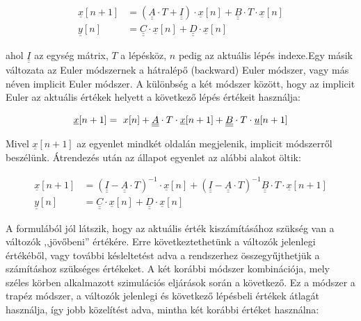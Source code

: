 \begin{equation}
\begin{align*}
\underline{x}[n + 1] &= (\underline{\underline{A}} \cdot T + \underline{\underline{I}}) \cdot \underline{x}[n] + \underline{\underline{B}}\cdot{}T\cdot{}\underline{x}[n] \\[0.3em]
\underline{y}[n] &= \underline{\underline{C}}\cdot \underline{x}[n] + \underline{\underline{D}}\cdot{}\underline{x}[n]
\end{align*} 
\end{equation}

ahol $\underline{\underline{I}}$ az egység mátrix, $T$ a lépésköz, $n$ pedig az aktuális lépés indexe.Egy másik változata az Euler módszernek a hátralépő (backward) Euler módszer, vagy más néven implicit Euler módszer. A különbség a két módszer között, hogy az implicit Euler az aktuális értékek helyett a következő lépés értékeit használja:

\begin{equation}
\underline{x}[n + 1] = \ x[n] + \underline{\underline{A}} \cdot T \cdot \underline{x}[n + 1] + \underline{\underline{B}}\cdot{}T\cdot{}\underline{u}[n+1] \\[0.3em]
\end{equation}

Mivel $\underline{x}[n+1]$ az egyenlet mindkét oldalán megjelenik, implicit módszerről beszélünk. Átrendezés után az állapot egyenlet az alábbi alakot öltik:

\begin{equation}
\begin{align*}
\underline{x}[n + 1] &= (\underline{\underline{I}} - \underline{\underline{A}} \cdot T )^{-1} \cdot\underline{x}[n] + (\underline{\underline{I}} - \underline{\underline{A}} \cdot T)^{-1} \underline{\underline{B}}\cdot{}T\cdot{}\underline{x}[n + 1] \\[0.3em]
\underline{y}[n] &= \underline{\underline{C}}\cdot \underline{x}[n] + \underline{\underline{D}}\cdot{}\underline{x}[n]
\end{align*} 
\end{equation}

A formulából jól látszik, hogy az aktuális érték kiszámításához szükség van a változók ,,jövőbeni'' értékére. Erre következtethetünk a változók jelenlegi értékéből, vagy további késleltetést adva a rendszerhez összegyűjthetjük a számításhoz szükséges értékeket.
A két korábbi módszer kombinációja, mely széles körben alkalmazott szimulációs eljárások során a következő. Ez a módszer a trapéz módszer, a változók jelenlegi és következő lépésbeli értékek átlagát használja, így jobb közelítést adva, mintha két korábbi értéket használna:

